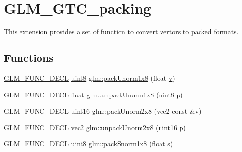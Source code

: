 \hypertarget{group__gtc__packing}{}\section{G\+L\+M\+\_\+\+G\+T\+C\+\_\+packing}
\label{group__gtc__packing}


This extension provides a set of function to convert vertors to packed formats.  


\subsection*{Functions}
\begin{DoxyCompactItemize}
\item 
\mbox{\hyperlink{setup_8hpp_ab2d052de21a70539923e9bcbf6e83a51}{G\+L\+M\+\_\+\+F\+U\+N\+C\+\_\+\+D\+E\+CL}} \mbox{\hyperlink{group__gtc__type__precision_ga1a7dcd8aac97cc8020817c94049deff2}{uint8}} \mbox{\hyperlink{group__gtc__packing_ga2f9963e5d762b10085b280d3662017ba}{glm\+::pack\+Unorm1x8}} (float \mbox{\hyperlink{glad_8h_a14cfbe2fc2234f5504618905b69d1e06}{v}})
\item 
\mbox{\hyperlink{setup_8hpp_ab2d052de21a70539923e9bcbf6e83a51}{G\+L\+M\+\_\+\+F\+U\+N\+C\+\_\+\+D\+E\+CL}} float \mbox{\hyperlink{group__gtc__packing_ga32f3f2642df2ea87449d59fb614a8305}{glm\+::unpack\+Unorm1x8}} (\mbox{\hyperlink{group__gtc__type__precision_ga1a7dcd8aac97cc8020817c94049deff2}{uint8}} p)
\item 
\mbox{\hyperlink{setup_8hpp_ab2d052de21a70539923e9bcbf6e83a51}{G\+L\+M\+\_\+\+F\+U\+N\+C\+\_\+\+D\+E\+CL}} \mbox{\hyperlink{group__gtc__type__precision_gad8c2939e1fdd8e5828b31d95c52255d5}{uint16}} \mbox{\hyperlink{group__gtc__packing_ga833288fc0d4a79f19d0db75a6843bfe6}{glm\+::pack\+Unorm2x8}} (\mbox{\hyperlink{group__core__types_gaa1618f51db67eaa145db101d8c8431d8}{vec2}} const \&\mbox{\hyperlink{glad_8h_a14cfbe2fc2234f5504618905b69d1e06}{v}})
\item 
\mbox{\hyperlink{setup_8hpp_ab2d052de21a70539923e9bcbf6e83a51}{G\+L\+M\+\_\+\+F\+U\+N\+C\+\_\+\+D\+E\+CL}} \mbox{\hyperlink{group__core__types_gaa1618f51db67eaa145db101d8c8431d8}{vec2}} \mbox{\hyperlink{group__gtc__packing_ga96ce0c24339ee676e28a027fffd1edf6}{glm\+::unpack\+Unorm2x8}} (\mbox{\hyperlink{group__gtc__type__precision_gad8c2939e1fdd8e5828b31d95c52255d5}{uint16}} p)
\item 
\mbox{\hyperlink{setup_8hpp_ab2d052de21a70539923e9bcbf6e83a51}{G\+L\+M\+\_\+\+F\+U\+N\+C\+\_\+\+D\+E\+CL}} \mbox{\hyperlink{group__gtc__type__precision_ga1a7dcd8aac97cc8020817c94049deff2}{uint8}} \mbox{\hyperlink{group__gtc__packing_ga26b6cd7a35c46c4b6a342f3b97b47423}{glm\+::pack\+Snorm1x8}} (float \mbox{\hyperlink{glad_8h_af1b1d5edfea6a34daee7389b1b5810ad}{s}})

\end{DoxyCompactItemize}
